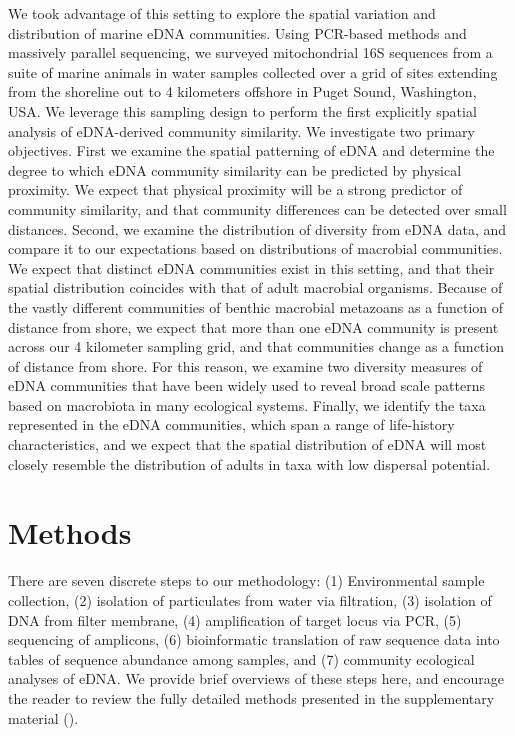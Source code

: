 \documentclass[11pt,letterpaper]{article} %
\begin{document}
We took advantage of this setting to explore the spatial variation and distribution of marine eDNA communities. Using PCR-based methods and massively parallel sequencing, we surveyed mitochondrial 16S sequences from a suite of marine animals in water samples collected over a grid of sites extending from the shoreline out to 4 kilometers offshore in Puget Sound, Washington, USA. We leverage this sampling design to perform the first explicitly spatial analysis of eDNA-derived community similarity. We investigate two primary objectives. First we examine the spatial patterning of eDNA and determine the degree to which eDNA community similarity can be predicted by physical proximity. We expect that physical proximity will be a strong predictor of community similarity, and that community differences can be detected over small distances. Second, we examine the distribution of diversity from eDNA data, and compare it to our expectations based on distributions of macrobial communities. We expect that distinct eDNA communities exist in this setting, and that their spatial distribution coincides with that of adult macrobial organisms. Because of the vastly different communities of benthic macrobial metazoans as a function of distance from shore, we expect that more than one eDNA community is present across our 4 kilometer sampling grid, and that communities change as a function of distance from shore. For this reason, we examine two diversity measures of eDNA communities that have been widely used to reveal broad scale patterns based on macrobiota in many ecological systems. Finally, we identify the taxa represented in the eDNA communities, which span a range of life-history characteristics, and we expect that the spatial distribution of eDNA will most closely resemble the distribution of adults in taxa with low dispersal potential.


\section*{Methods}
There are seven discrete steps to our methodology: (1) Environmental sample collection, (2) isolation of particulates from water via filtration, (3) isolation of DNA from filter membrane, (4) amplification of target locus via PCR, (5) sequencing of amplicons, (6) bioinformatic translation of raw sequence data into tables of sequence abundance among samples, and (7) community ecological analyses of eDNA. We provide brief overviews of these steps here, and encourage the reader to review the fully detailed methods presented in the supplementary material ().
\end{document}
